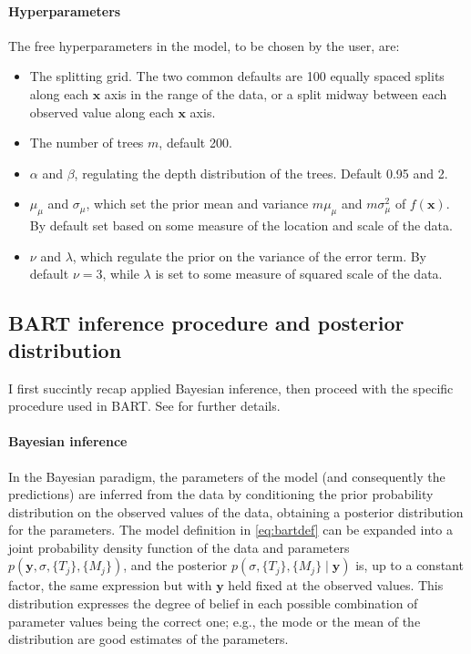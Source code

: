\documentclass{article}
\begin{document}
    \paragraph{Hyperparameters}
    
    The free hyperparameters in the model, to be chosen by the user, are:
    \begin{itemize}

        \item The splitting grid. The two common defaults are 100 equally spaced splits along each $\mathbf x$ axis in the range of the data, or a split midway between each observed value along each $\mathbf x$ axis.
        
        \item The number of trees $m$, default 200.
        
        \item $\alpha$ and $\beta$, regulating the depth distribution of the
        trees. Default 0.95 and 2.
        
        \item $\mu_\mu$ and $\sigma_\mu$, which set the prior mean and variance
        $m\mu_\mu$ and $m\sigma_\mu^2$ of $f(\mathbf x)$. By default set based on some measure of the location and scale of the data.
        
        \item $\nu$ and $\lambda$, which regulate the prior on the variance of the error term. By default $\nu=3$, while $\lambda$ is set to some measure of squared scale of the data.

    \end{itemize}

    \subsection{BART inference procedure and posterior distribution}

    I first succintly recap applied Bayesian inference, then proceed with the specific procedure used in BART. See \textcites{chipman1998,chipman2010}[\S A]{kapelner2016}[ch.~5]{daniels2023}[\S2.1.4, p.~5]{tan2019} for further details.

    \paragraph{Bayesian inference}

    In the Bayesian paradigm, the parameters of the model (and consequently the predictions) are inferred from the data by conditioning the prior probability distribution on the observed values of the data, obtaining a posterior distribution for the parameters. The model definition in \autoref{eq:bartdef} can be expanded into a joint probability density function of the data and parameters $p(\mathbf y, \sigma, \{T_j\}, \{M_j\})$, and the posterior $p(\sigma, \{T_j\}, \{M_j\}\mid \mathbf y)$ is, up to a constant factor, the same expression but with $\mathbf y$ held fixed at the observed values. This distribution expresses the degree of belief in each possible combination of parameter values being the correct one; e.g., the mode or the mean of the distribution are good estimates of the parameters.
\end{document}
